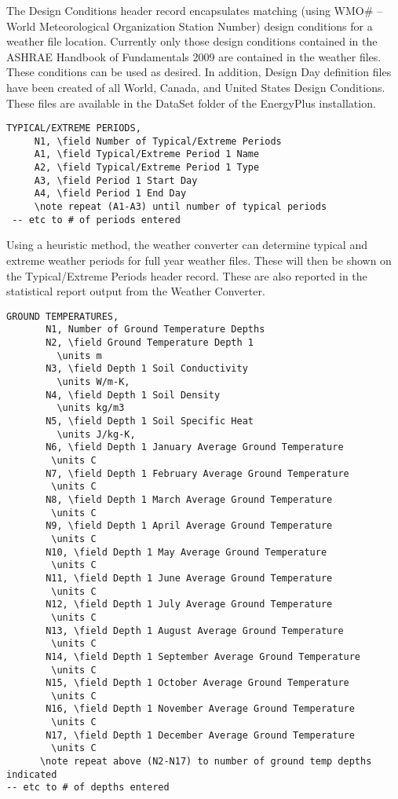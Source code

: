 The Design Conditions header record encapsulates matching (using WMO\# -- World Meteorological Organization Station Number) design conditions for a weather file location. Currently only those design conditions contained in the ASHRAE Handbook of Fundamentals 2009 are contained in the weather files. These conditions can be used as desired. In addition, Design Day definition files have been created of all World, Canada, and United States Design Conditions. These files are available in the DataSet folder of the EnergyPlus installation.

\begin{lstlisting}
TYPICAL/EXTREME PERIODS,
     N1, \field Number of Typical/Extreme Periods
     A1, \field Typical/Extreme Period 1 Name
     A2, \field Typical/Extreme Period 1 Type
     A3, \field Period 1 Start Day
     A4, \field Period 1 End Day
     \note repeat (A1-A3) until number of typical periods
 -- etc to # of periods entered
\end{lstlisting}

Using a heuristic method, the weather converter can determine typical and extreme weather periods for full year weather files. These will then be shown on the Typical/Extreme Periods header record. These are also reported in the statistical report output from the Weather Converter.

\begin{lstlisting}
GROUND TEMPERATURES,
       N1, Number of Ground Temperature Depths
       N2, \field Ground Temperature Depth 1
         \units m
       N3, \field Depth 1 Soil Conductivity
         \units W/m-K,
       N4, \field Depth 1 Soil Density
         \units kg/m3
       N5, \field Depth 1 Soil Specific Heat
         \units J/kg-K,
       N6, \field Depth 1 January Average Ground Temperature
        \units C
       N7, \field Depth 1 February Average Ground Temperature
        \units C
       N8, \field Depth 1 March Average Ground Temperature
        \units C
       N9, \field Depth 1 April Average Ground Temperature
        \units C
       N10, \field Depth 1 May Average Ground Temperature
        \units C
       N11, \field Depth 1 June Average Ground Temperature
        \units C
       N12, \field Depth 1 July Average Ground Temperature
        \units C
       N13, \field Depth 1 August Average Ground Temperature
        \units C
       N14, \field Depth 1 September Average Ground Temperature
        \units C
       N15, \field Depth 1 October Average Ground Temperature
        \units C
       N16, \field Depth 1 November Average Ground Temperature
        \units C
       N17, \field Depth 1 December Average Ground Temperature
        \units C
      \note repeat above (N2-N17) to number of ground temp depths indicated
-- etc to # of depths entered
\end{lstlisting}

